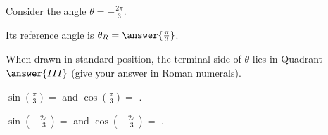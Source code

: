 \documentclass{ximera}
\author{Kenneth Berglund}
\begin{document}
\begin{exercise}
Consider the angle $\theta = -\frac{2\pi}{3}$. 

Its reference angle is $\theta_R = \answer{\frac{\pi}{3}}$.

When drawn in standard position, the terminal side of $\theta$ lies in Quadrant $\answer{III}$ (give your answer in Roman numerals). 

\begin{exercise}
$\sin\left(\frac{\pi}{3}\right)=$\wordChoice{\choice[correct]{$+$}\choice{$-$}}  and $\cos\left(\frac{\pi}{3}\right) =$\wordChoice{\choice[correct]{$+$}\choice{$-$}} .

\begin{exercise}
$\sin\left(-\frac{2\pi}{3}\right)=$\wordChoice{\choice{$+$}\choice[correct]{$-$}}  and $\cos\left(-\frac{2\pi}{3}\right) =$\wordChoice{\choice{$+$}\choice[correct]{$-$}} .
\end{exercise}
\end{exercise}

\end{exercise}
\end{document}
